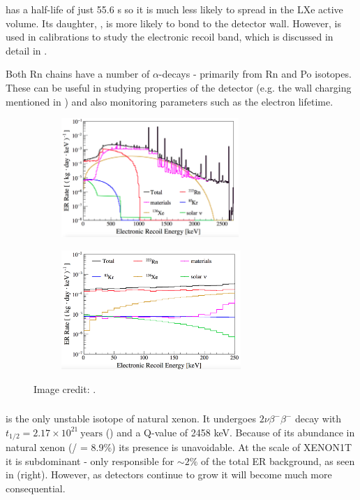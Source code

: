  has a half-life of just 55.6 s so it is much less likely to spread in the LXe active volume.  Its daughter, ,
is more likely to bond to the detector wall.  However,  is used in calibrations to study the electronic recoil band, which is
discussed in detail in .

Both Rn chains have a number of $\alpha$-decays - primarily from Rn and Po isotopes.  These can be useful in studying properties of the
detector (e.g. the wall charging mentioned in ) and also monitoring parameters such as
the electron lifetime.

\begin{figure}
    \centering
    \begin{subfigure}[t]{0.45\textwidth}
        \centering
        \includegraphics[height=4.5cm]{ERRateMCFull}
    \end{subfigure}%
    \begin{subfigure}[t]{0.45\textwidth}
        \centering
        \includegraphics[height=4.5cm]{ERRateMCZoomed}
    \end{subfigure}
    \caption{Image credit: %
    .}
	\label{fig:backgrounds_er_spectrum}
\end{figure}



\subsubsection{}
\label{subsubsec:backgrounds_electronic_xe}
 is the only unstable isotope of natural xenon.  It undergoes $2 \nu \beta^- \beta^-$ decay with
$t_{1/2} = 2.17 \times 10^{21}\ \mathrm{years}$ () and a Q-value of 2458 keV.  Because of its abundance in natural
xenon (/ = 8.9\%) its presence is unavoidable.  At the scale of XENON1T it is subdominant - only responsible for
${\sim}2 \%$ of the total ER background, as seen in  (right).  However, as detectors continue to grow
it will become much more consequential.



